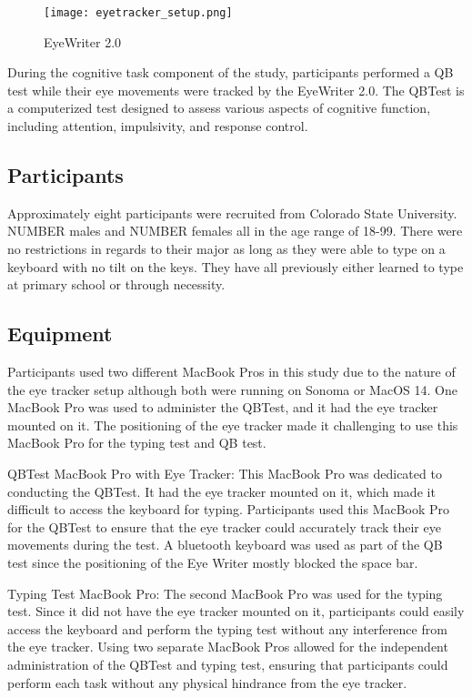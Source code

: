 \documentclass[manuscript, screen, review]{acmart} %
\begin{document}
\begin{figure}
  \texttt{[image: eyetracker\_setup.png]}
  \caption{EyeWriter 2.0}
\end{figure}

During the cognitive task component of the study, participants performed a QB test while their eye movements were tracked by the EyeWriter 2.0. The QBTest is a computerized test designed to assess various aspects of cognitive function, including attention, impulsivity, and response control.

\subsection[short]{Participants}
Approximately eight participants were recruited from Colorado State University. NUMBER males and NUMBER females all in the age range of 18-99. There were no %
restrictions in regards to their major as long as they were able to type on a keyboard with no tilt on the keys.
They have all previously either learned to type at primary school or through necessity.

\subsection[short]{Equipment} 
Participants used two different MacBook Pros in this study due to the nature of the eye tracker setup although both were running on Sonoma or MacOS 14. One MacBook Pro was used to administer the QBTest, and it had the eye tracker mounted on it. The positioning of the eye tracker made it challenging to use this MacBook Pro for the typing test and QB test. 

QBTest MacBook Pro with Eye Tracker: This MacBook Pro was dedicated to conducting the QBTest. It had the eye tracker mounted on it, which made it difficult to access the keyboard for typing. Participants used this MacBook Pro for the QBTest to ensure that the eye tracker could accurately track their eye movements during the test. A bluetooth keyboard was used as part of the QB test since the positioning of the Eye Writer mostly blocked the space bar.

Typing Test MacBook Pro: The second MacBook Pro was used for the typing test. Since it did not have the eye tracker mounted on it, participants could easily access the keyboard and perform the typing test without any interference from the eye tracker.
Using two separate MacBook Pros allowed for the independent administration of the QBTest and typing test, ensuring that participants could perform each task without any physical hindrance from the eye tracker.
\end{document}
